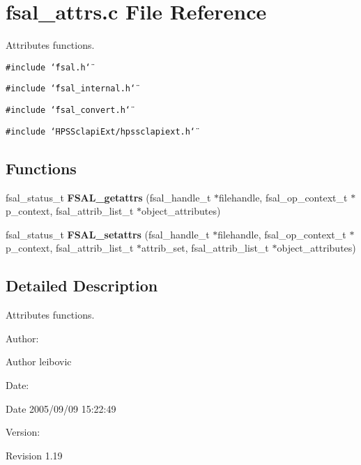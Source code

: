 \section{fsal\_\-attrs.c File Reference}
\label{fsal__attrs_8c}
Attributes functions.  


{\tt \#include \char`\"{}fsal.h\char`\"{}}\par
{\tt \#include \char`\"{}fsal\_\-internal.h\char`\"{}}\par
{\tt \#include \char`\"{}fsal\_\-convert.h\char`\"{}}\par
{\tt \#include \char`\"{}HPSSclapiExt/hpssclapiext.h\char`\"{}}\par
\subsection*{Functions}
\begin{CompactItemize}
\item 
fsal\_\-status\_\-t {\bf FSAL\_\-getattrs} (fsal\_\-handle\_\-t $\ast$filehandle, fsal\_\-op\_\-context\_\-t $\ast$p\_\-context, fsal\_\-attrib\_\-list\_\-t $\ast$object\_\-attributes)
\item 
fsal\_\-status\_\-t {\bf FSAL\_\-setattrs} (fsal\_\-handle\_\-t $\ast$filehandle, fsal\_\-op\_\-context\_\-t $\ast$p\_\-context, fsal\_\-attrib\_\-list\_\-t $\ast$attrib\_\-set, fsal\_\-attrib\_\-list\_\-t $\ast$object\_\-attributes)
\end{CompactItemize}


\subsection{Detailed Description}
Attributes functions. 

\begin{Desc}
\item[Author:]\end{Desc}
\begin{Desc}
\item[Author]leibovic \end{Desc}
\begin{Desc}
\item[Date:]\end{Desc}
\begin{Desc}
\item[Date]2005/09/09 15:22:49 \end{Desc}
\begin{Desc}
\item[Version:]\end{Desc}
\begin{Desc}
\item[Revision]1.19 \end{Desc}


